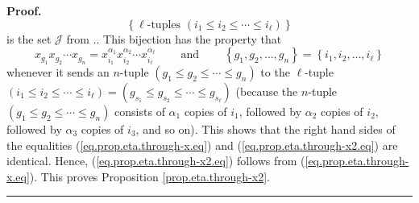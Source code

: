 \documentclass[numbers=enddot,12pt,final,onecolumn,notitlepage]{scrartcl}%
\theoremstyle{definition}
\newenvironment{proof}[1][Proof]{\noindent\textbf{#1.} }{\ \rule{0.5em}{0.5em}}
\newenvironment{vershort}{}{}
\begin{document}
\begin{vershort}
\begin{proof}
{\[
\left\{  \ell\text{-tuples }\left(  i_{1}\leq i_{2}\leq\cdots\leq i_{\ell
}\right)  \right\}
\]
is the set $\mathcal{J}$ from \cite[detailed version, proof of Proposition
10.69]{Grinbe15}.}. This bijection has the property that
\[
x_{g_{1}}x_{g_{2}}\cdots x_{g_{n}}=x_{i_{1}}^{\alpha_{1}}x_{i_{2}}^{\alpha
_{2}}\cdots x_{i_{\ell}}^{\alpha_{\ell}}\ \ \ \ \ \ \ \ \ \ \text{and}%
\ \ \ \ \ \ \ \ \ \ \left\{  g_{1},g_{2},\ldots,g_{n}\right\}  =\left\{
i_{1},i_{2},\ldots,i_{\ell}\right\}
\]
whenever it sends an $n$-tuple $\left(  g_{1}\leq g_{2}\leq\cdots\leq
g_{n}\right)  $ to the $\ell$-tuple $\left(  i_{1}\leq i_{2}\leq\cdots\leq
i_{\ell}\right)  =\left(  g_{s_{1}}\leq g_{s_{2}}\leq\cdots\leq g_{s_{\ell}%
}\right)  $ (because the $n$-tuple $\left(  g_{1}\leq g_{2}\leq\cdots\leq
g_{n}\right)  $ consists of $\alpha_{1}$ copies of $i_{1}$, followed by
$\alpha_{2}$ copies of $i_{2}$, followed by $\alpha_{3}$ copies of $i_{3}$,
and so on). This shows that the right hand sides of the equalities
(\ref{eq.prop.eta.through-x.eq}) and (\ref{eq.prop.eta.through-x2.eq}) are
identical. Hence, (\ref{eq.prop.eta.through-x2.eq}) follows from
(\ref{eq.prop.eta.through-x.eq}). This proves Proposition
\ref{prop.eta.through-x2}.
\end{proof}
\end{vershort}
\end{document}
